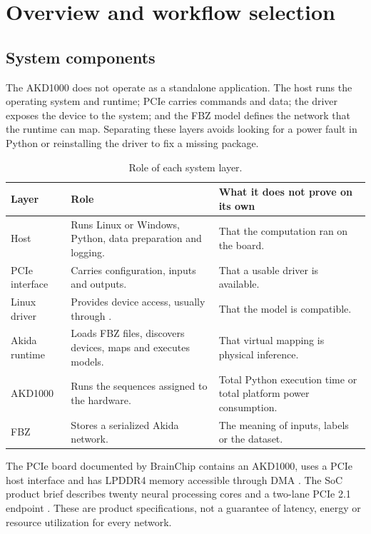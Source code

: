 \chapter{Overview and workflow selection}
\label{chap:orientacion}

\section{System components}

The AKD1000 does not operate as a standalone application. The host runs the operating
system and runtime; PCIe carries commands and data; the driver exposes the device to
the system; and the FBZ model defines the network that the runtime can map.
Separating these layers avoids looking for a power fault in Python or reinstalling
the driver to fix a missing package.

\begin{table}[H]
\centering
\caption{Role of each system layer.}
\label{tab:capas}
\begin{tabularx}{\textwidth}{@{}L{0.22\textwidth}YY@{}}
\toprule
\textbf{Layer} & \textbf{Role} & \textbf{What it does not prove on its own} \\
\midrule
Host & Runs Linux or Windows, Python, data preparation and logging. & That the computation ran on the board. \\
PCIe interface & Carries configuration, inputs and outputs. & That a usable driver is available. \\
Linux driver & Provides device access, usually through . & That the model is compatible. \\
Akida runtime & Loads FBZ files, discovers devices, maps and executes models. & That virtual mapping is physical inference. \\
AKD1000 & Runs the sequences assigned to the hardware. & Total Python execution time or total platform power consumption. \\
FBZ & Stores a serialized Akida network. & The meaning of inputs, labels or the dataset. \\
\bottomrule
\end{tabularx}
\end{table}

The PCIe board documented by BrainChip contains an AKD1000, uses a PCIe host interface
and has LPDDR4 memory accessible through DMA \cite{brainchip_card_brief}.
The SoC product brief describes twenty neural processing cores and a two-lane PCIe 2.1
endpoint \cite{brainchip_soc_brief}. These are product specifications, not a guarantee
of latency, energy or resource utilization for every network.

